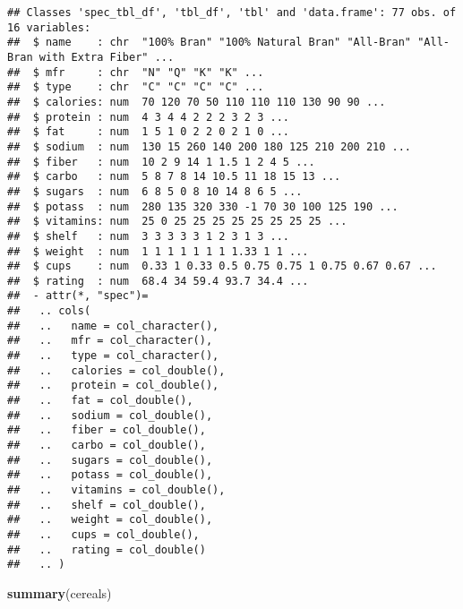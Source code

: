 \documentclass[]{article}
\newenvironment{Shaded}{\begin{snugshade}}{\end{snugshade}}
\newcommand{\KeywordTok}[1]{\textcolor[rgb]{0.13,0.29,0.53}{\textbf{#1}}}
\newcommand{\NormalTok}[1]{#1}
\begin{document}
\begin{verbatim}
## Classes 'spec_tbl_df', 'tbl_df', 'tbl' and 'data.frame': 77 obs. of  16 variables:
##  $ name    : chr  "100% Bran" "100% Natural Bran" "All-Bran" "All-Bran with Extra Fiber" ...
##  $ mfr     : chr  "N" "Q" "K" "K" ...
##  $ type    : chr  "C" "C" "C" "C" ...
##  $ calories: num  70 120 70 50 110 110 110 130 90 90 ...
##  $ protein : num  4 3 4 4 2 2 2 3 2 3 ...
##  $ fat     : num  1 5 1 0 2 2 0 2 1 0 ...
##  $ sodium  : num  130 15 260 140 200 180 125 210 200 210 ...
##  $ fiber   : num  10 2 9 14 1 1.5 1 2 4 5 ...
##  $ carbo   : num  5 8 7 8 14 10.5 11 18 15 13 ...
##  $ sugars  : num  6 8 5 0 8 10 14 8 6 5 ...
##  $ potass  : num  280 135 320 330 -1 70 30 100 125 190 ...
##  $ vitamins: num  25 0 25 25 25 25 25 25 25 25 ...
##  $ shelf   : num  3 3 3 3 3 1 2 3 1 3 ...
##  $ weight  : num  1 1 1 1 1 1 1 1.33 1 1 ...
##  $ cups    : num  0.33 1 0.33 0.5 0.75 0.75 1 0.75 0.67 0.67 ...
##  $ rating  : num  68.4 34 59.4 93.7 34.4 ...
##  - attr(*, "spec")=
##   .. cols(
##   ..   name = col_character(),
##   ..   mfr = col_character(),
##   ..   type = col_character(),
##   ..   calories = col_double(),
##   ..   protein = col_double(),
##   ..   fat = col_double(),
##   ..   sodium = col_double(),
##   ..   fiber = col_double(),
##   ..   carbo = col_double(),
##   ..   sugars = col_double(),
##   ..   potass = col_double(),
##   ..   vitamins = col_double(),
##   ..   shelf = col_double(),
##   ..   weight = col_double(),
##   ..   cups = col_double(),
##   ..   rating = col_double()
##   .. )
\end{verbatim}

\begin{Shaded}
\begin{Highlighting}[]
\KeywordTok{summary}\NormalTok{(cereals)}
\end{Highlighting}
\end{Shaded}
\end{document}
